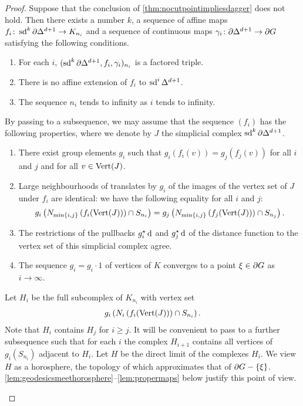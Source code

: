 \documentclass[a4paper]{article}
\begin{document}
\begin{proof}

Suppose that the conclusion of \cref{thm:nocutpointimpliesdagger} 
does not hold. Then there exists a number $k$, a sequence of affine maps 
$f_i\colon\operatorname{sd}^k\partial\Delta^{d+1}\to K_{n_i}$ and a sequence of continuous 
maps $\gamma_i\colon\partial\Delta^{d+1}\to\partial G$ satisfying the following 
conditions.
\begin{enumerate}
  \item For each $i$, $(\operatorname{sd}^k\partial\Delta^{d+1}, f_i, \gamma_i)_{n_i}$ is a 
    factored triple.
  \item There is no affine extension of $f_i$ to $\operatorname{sd}^i\Delta^{d+1}$.
  \item The sequence $n_i$ tends to infinity as $i$ tends to infinity.
\end{enumerate}

By passing to a subsequence, we may assume that the sequence $(f_i)$ has the 
following properties, where we denote by $J$ the simplicial complex 
$\operatorname{sd}^k\partial\Delta^{d+1}$.
\begin{enumerate}
  \item There exist group elements $g_i$ such that $g_i(f_i(v)) = g_j(f_j(v))$ 
    for all $i$ and $j$ and for all $v \in \operatorname{Vert}(J)$.
  \item Large neighbourhoods of translates by $g_i$ of the images of the vertex 
    set of $J$ under $f_i$ are identical: we have the following equality for all 
    $i$ and $j$:
    \begin{align*}
      g_i\left(N_{\min\left\{i,j\right\}}\left(f_i(\operatorname{Vert}(J))\right) \cap 
      S_{n_i}\right) = g_j\left(N_{\min\left\{i,j\right\}}\left(f_j(\operatorname{Vert}(J))\right) 
      \cap S_{n_j}\right).
    \end{align*}
  \item The restrictions of the pullbacks $g_i^\star\operatorname{d}$ and 
    $g_j^\star\operatorname{d}$ of the distance function to the vertex set of this 
    simplicial complex agree.
  \item The sequence $g_i = g_i\cdot 1$ of vertices of $K$ converges to a point 
    $\xi\in\partial G$ as $i\to\infty$.
\end{enumerate}

\begin{definition}
  Let $H_i$ be the full subcomplex of $K_{n_i}$ with vertex set
  \begin{align*}
    g_i\left(N_i\left(f_i(\operatorname{Vert} (J))\right)\cap S_{n_i}\right).
  \end{align*}
  Note that $H_i$ contains $H_j$ for $i \geq j$. It will be convenient to pass 
  to a further subsequence such that for each $i$ the complex $H_{i+1}$ contains 
  all vertices of $g_i(S_{n_i})$ adjacent to $H_i$. Let $H$ be the direct
  limit of the complexes $H_i$.  We view $H$ as a horosphere, the topology of
  which approximates that of $\partial G - \left\{\xi\right\}$.
  \cref{lem:geodesicsmeethorosphere}--\ref{lem:propermaps} below justify 
  this point of view.


\end{definition}
\end{proof}
\end{document}
